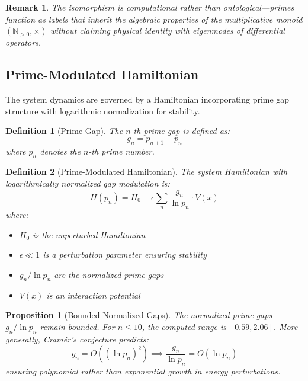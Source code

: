 \documentclass[12pt,a4paper]{article}
\newtheorem{definition}{Definition}[section]
\newtheorem{proposition}[theorem]{Proposition}
\newtheorem{remark}{Remark}[section]
\begin{document}
\begin{remark}
The isomorphism is \emph{computational} rather than \emph{ontological}---primes function as labels that inherit the algebraic properties of the multiplicative monoid $(\mathbb{N}_{>0}, \times)$ without claiming physical identity with eigenmodes of differential operators.
\end{remark}

\subsection{Prime-Modulated Hamiltonian}

The system dynamics are governed by a Hamiltonian incorporating prime gap structure with logarithmic normalization for stability.

\begin{definition}[Prime Gap]
The \emph{$n$-th prime gap} is defined as:
\begin{equation}
    g_n = p_{n+1} - p_n
\end{equation}
where $p_n$ denotes the $n$-th prime number.
\end{definition}

\begin{definition}[Prime-Modulated Hamiltonian]
\label{def:hamiltonian}
The system Hamiltonian with logarithmically normalized gap modulation is:
\begin{equation}
    H(p_n) = H_0 + \epsilon \sum_n \frac{g_n}{\ln p_n} \cdot V(x)
\end{equation}
where:
\begin{itemize}
    \item $H_0$ is the unperturbed Hamiltonian
    \item $\epsilon \ll 1$ is a perturbation parameter ensuring stability
    \item $g_n / \ln p_n$ are the normalized prime gaps
    \item $V(x)$ is an interaction potential
\end{itemize}
\end{definition}

\begin{proposition}[Bounded Normalized Gaps]
\label{prop:bounded_gaps}
The normalized prime gaps $g_n / \ln p_n$ remain bounded. For $n \leq 10$, the computed range is $[0.59, 2.06]$. More generally, Cramér's conjecture predicts:
\begin{equation}
    g_n = O((\ln p_n)^2) \implies \frac{g_n}{\ln p_n} = O(\ln p_n)
\end{equation}
ensuring polynomial rather than exponential growth in energy perturbations.
\end{proposition}
\end{document}
